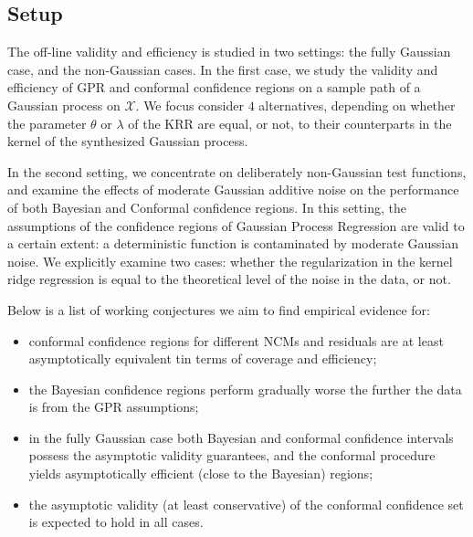 \documentclass[a4paper,14pt]{extarticle}
\newcommand{\Xcal}{\mathcal{X}}
\begin{document}
\subsection{Setup} %
\label{sub:setup}

The off-line validity and efficiency is studied in two settings: the fully Gaussian
case, and the non-Gaussian cases. In the first case, we study the validity and
efficiency of GPR and conformal confidence regions on a sample path of a Gaussian
process on $\Xcal$. We focus consider $4$ alternatives, depending on whether the
parameter $\theta$ or $\lambda$ of the KRR are equal, or not, to their counterparts
in the kernel of the synthesized Gaussian process.

In the second setting, we concentrate on deliberately non-Gaussian test functions,
and examine the effects of moderate Gaussian additive noise on the performance of
both Bayesian and Conformal confidence regions. In this setting, the assumptions
of the confidence regions of Gaussian Process Regression are valid to a certain
extent: a deterministic function is contaminated by moderate Gaussian noise. We
explicitly examine two cases: whether the regularization in the kernel ridge regression
is equal to the theoretical level of the noise in the data, or not.

Below is a list of working conjectures we aim to find empirical evidence for: \begin{itemize}
  \item conformal confidence regions for different NCMs and residuals are at least
  asymptotically equivalent tin terms of coverage and efficiency;
  \item the Bayesian confidence regions perform gradually worse the further the data
  is from the GPR assumptions;
  \item in the fully Gaussian case both Bayesian and conformal confidence intervals
  possess the asymptotic validity guarantees, and the conformal procedure yields
  asymptotically efficient (close to the Bayesian) regions;
  \item the asymptotic validity (at least conservative) of the conformal confidence
  set is expected to hold in all cases.
\end{itemize}
\end{document}
